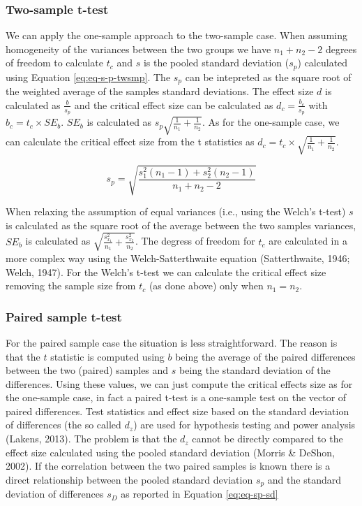 \documentclass[
  man]{apa7}
\begin{document}
\hypertarget{two-sample-t-test}{%
\subsubsection{Two-sample t-test}\label{two-sample-t-test}}

We can apply the one-sample approach to the two-sample case. When assuming homogeneity of the variances between the two groups we have \(n_1 + n_2 - 2\) degrees of freedom to calculate \(t_c\) and \(s\) is the pooled standard deviation (\(s_p\)) calculated using Equation \eqref{eq:eq-s-p-twsmp}. The \(s_p\) can be intepreted as the square root of the weighted average of the samples standard deviations. The effect size \(d\) is calculated as \(\frac{b}{s_p}\) and the critical effect size can be calculated as \(d_c = \frac{b_c}{s_p}\) with \(b_c = t_c \times SE_b\). \(SE_b\) is calculated as \(s_p \sqrt{\frac{1}{n_1} + \frac{1}{n_2}}\). As for the one-sample case, we can calculate the critical effect size from the t statistics as \(d_c = t_c \times \sqrt{\frac{1}{n_1} + \frac{1}{n_2}}\).

\begin{equation}
    \label{eq:eq-s-p-twsmp}
    s_p = \sqrt{\frac{s_1^2 (n_1 - 1) + s_2^2 (n_2 - 1)}{n_1 + n_2 - 2}}
\end{equation}

When relaxing the assumption of equal variances (i.e., using the Welch's t-test) \(s\) is calculated as the square root of the average between the two samples variances, \(SE_b\) is calculated as \(\sqrt{\frac{s^2_{x_1}}{n_1} + \frac{s^2_{x_2}}{n_2}}\). The degress of freedom for \(t_c\) are calculated in a more complex way using the Welch-Satterthwaite equation (Satterthwaite, 1946; Welch, 1947). For the Welch's t-test we can calculate the critical effect size removing the sample size from \(t_c\) (as done above) only when \(n_1 = n_2\).

\hypertarget{paired-sample-t-test}{%
\subsubsection{Paired sample t-test}\label{paired-sample-t-test}}

For the paired sample case the situation is less straightforward. The reason is that the \(t\) statistic is computed using \(b\) being the average of the paired differences between the two (paired) samples and \(s\) being the standard deviation of the differences. Using these values, we can just compute the critical effects size as for the one-sample case, in fact a paired t-test is a one-sample test on the vector of paired differences. Test statistics and effect size based on the standard deviation of differences (the so called \(d_z\)) are used for hypothesis testing and power analysis (Lakens, 2013). The problem is that the \(d_z\) cannot be directly compared to the effect size calculated using the pooled standard deviation (Morris \& DeShon, 2002). If the correlation between the two paired samples is known there is a direct relationship between the pooled standard deviation \(s_p\) and the standard deviation of differences \(s_D\) as reported in Equation \eqref{eq:eq-sp-sd}
\end{document}

